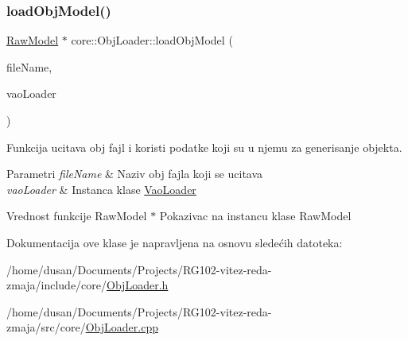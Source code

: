\subsubsection{\texorpdfstring{load\+Obj\+Model()}{loadObjModel()}}
{\footnotesize\ttfamily \hyperlink{classmodel_1_1RawModel}{Raw\+Model} $\ast$ core\+::\+Obj\+Loader\+::load\+Obj\+Model (\begin{DoxyParamCaption}\item[{const char $\ast$}]{file\+Name,  }\item[{\hyperlink{classcore_1_1VaoLoader}{Vao\+Loader} $\ast$}]{vao\+Loader }\end{DoxyParamCaption})}



Funkcija ucitava obj fajl i koristi podatke koji su u njemu za generisanje objekta. 


\begin{DoxyParams}{Parametri}
{\em file\+Name} & Naziv obj fajla koji se ucitava \\
\hline
{\em vao\+Loader} & Instanca klase \hyperlink{classcore_1_1VaoLoader}{Vao\+Loader} \\
\hline
\end{DoxyParams}
\begin{DoxyReturn}{Vrednost funkcije}
Raw\+Model $\ast$ Pokazivac na instancu klase Raw\+Model 
\end{DoxyReturn}


Dokumentacija ove klase je napravljena na osnovu sledećih datoteka\+:\begin{DoxyCompactItemize}
\item 
/home/dusan/\+Documents/\+Projects/\+R\+G102-\/vitez-\/reda-\/zmaja/include/core/\hyperlink{ObjLoader_8h}{Obj\+Loader.\+h}\item 
/home/dusan/\+Documents/\+Projects/\+R\+G102-\/vitez-\/reda-\/zmaja/src/core/\hyperlink{ObjLoader_8cpp}{Obj\+Loader.\+cpp}\end{DoxyCompactItemize}
